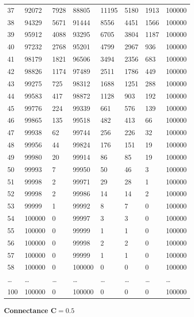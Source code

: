 \documentclass[]{article}
\begin{document}
\begin{longtable}[]{@{}llllllll@{}}
37 & 92072 & 7928 & 88805 & 11195 & 5180 & 1913 & 100000\tabularnewline
38 & 94329 & 5671 & 91444 & 8556 & 4451 & 1566 & 100000\tabularnewline
39 & 95912 & 4088 & 93295 & 6705 & 3804 & 1187 & 100000\tabularnewline
40 & 97232 & 2768 & 95201 & 4799 & 2967 & 936 & 100000\tabularnewline
41 & 98179 & 1821 & 96506 & 3494 & 2356 & 683 & 100000\tabularnewline
42 & 98826 & 1174 & 97489 & 2511 & 1786 & 449 & 100000\tabularnewline
43 & 99275 & 725 & 98312 & 1688 & 1251 & 288 & 100000\tabularnewline
44 & 99583 & 417 & 98872 & 1128 & 903 & 192 & 100000\tabularnewline
45 & 99776 & 224 & 99339 & 661 & 576 & 139 & 100000\tabularnewline
46 & 99865 & 135 & 99518 & 482 & 413 & 66 & 100000\tabularnewline
47 & 99938 & 62 & 99744 & 256 & 226 & 32 & 100000\tabularnewline
48 & 99956 & 44 & 99824 & 176 & 151 & 19 & 100000\tabularnewline
49 & 99980 & 20 & 99914 & 86 & 85 & 19 & 100000\tabularnewline
50 & 99993 & 7 & 99950 & 50 & 46 & 3 & 100000\tabularnewline
51 & 99998 & 2 & 99971 & 29 & 28 & 1 & 100000\tabularnewline
52 & 99998 & 2 & 99986 & 14 & 14 & 2 & 100000\tabularnewline
53 & 99999 & 1 & 99992 & 8 & 7 & 0 & 100000\tabularnewline
54 & 100000 & 0 & 99997 & 3 & 3 & 0 & 100000\tabularnewline
55 & 100000 & 0 & 99999 & 1 & 1 & 0 & 100000\tabularnewline
56 & 100000 & 0 & 99998 & 2 & 2 & 0 & 100000\tabularnewline
57 & 100000 & 0 & 99999 & 1 & 1 & 0 & 100000\tabularnewline
58 & 100000 & 0 & 100000 & 0 & 0 & 0 & 100000\tabularnewline
\ldots{} & \ldots{} & \ldots{} & \ldots{} & \ldots{} & \ldots{} &
\ldots{} & \ldots{}\tabularnewline
100 & 100000 & 0 & 100000 & 0 & 0 & 0 & 100000\tabularnewline
\bottomrule
\end{longtable}

\textbf{Connectance \(\mathbf{C = 0.5}\)}
\end{document}
